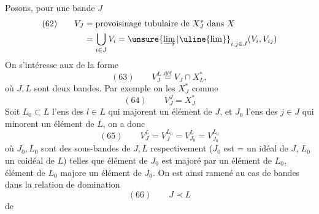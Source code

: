 

Posons, pour une bande $J$
\[
\begin{aligned}
(62)\qquad V_J&=\text{provoisinage tubulaire de }X_J^*\text{ dans }X\\
&=\bigcup_{i\in J}V_i=\unsure{\varinjlim|\uline{\lim}}_{i,j\in J}(V_i,V_{ij})
\end{aligned}
\]
On s'intéresse aux  de la forme
\[
(63)\qquad V_J^L\overset{\mathrm{déf}}{=}V_J\cap X_L^*,
\]
où $J,L$ sont deux bandes. Par exemple on  les $X_J^*$ comme
\[
(64)\qquad V_J^J=X_J^*
\]
Soit $L_0\subset L$ l'ens des $l\in L$ qui majorent un élément de $J$, et $J_0$ l'ens des $j\in J$ qui minorent un élément de $L$, on a donc
\[
(65)\qquad V_J^L=V_J^{L_0}=V_{J_0}^L=V_{J_0}^{L_0}
\]
où $J_0,L_0$ sont des sous-bandes de $J,L$ respectivement ($J_0$ est = un idéal de $J$, $L_0$ un coidéal de $L$) telles que  élément de $J_0$ est majoré par un élément de $L_0$,  élément de $L_0$ majore un élément de $J_0$. On est ainsi ramené au cas de bandes dans la relation de domination
\[
(66)\qquad J\prec L
\]
de
